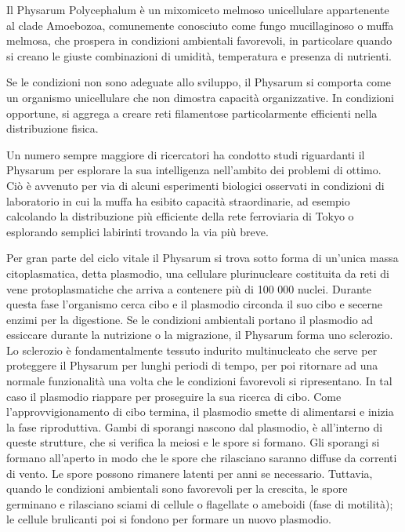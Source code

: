 Il Physarum Polycephalum\cite{Tsompanas2016} è un mixomiceto melmoso unicellulare appartenente al clade Amoebozoa, comunemente conosciuto come fungo mucillaginoso o muffa melmosa, che prospera in condizioni ambientali favorevoli, in particolare quando si creano le giuste combinazioni di umidità, temperatura e presenza di nutrienti.
\par
Se le condizioni non sono adeguate allo sviluppo, il Physarum si comporta come un organismo unicellulare che non dimostra capacità organizzative. In condizioni opportune, si aggrega a creare reti filamentose particolarmente efficienti nella distribuzione fisica.
\par 
Un numero sempre maggiore di ricercatori ha condotto studi riguardanti il Physarum per esplorare la sua intelligenza nell'ambito dei problemi di ottimo. Ciò è avvenuto per via di alcuni esperimenti biologici osservati in condizioni di laboratorio in cui la muffa ha esibito capacità straordinarie, ad esempio calcolando la distribuzione più efficiente della rete ferroviaria di Tokyo o esplorando semplici labirinti trovando la via più breve. 
\par
Per gran parte del ciclo vitale il Physarum si trova sotto forma di un'unica massa citoplasmatica, detta plasmodio, una cellulare plurinucleare costituita da reti di vene protoplasmatiche che arriva a contenere più di 100 000 nuclei.
Durante questa fase l'organismo cerca cibo e il plasmodio circonda il suo cibo e secerne enzimi per la digestione.
Se le condizioni ambientali portano il plasmodio ad essiccare durante la nutrizione o la migrazione, il Physarum forma uno sclerozio. Lo sclerozio è fondamentalmente tessuto indurito multinucleato che serve per proteggere il Physarum per lunghi periodi di tempo, per poi ritornare ad una normale funzionalità una volta che le condizioni favorevoli si ripresentano. In tal caso il plasmodio riappare per proseguire la sua ricerca di cibo.
Come l'approvvigionamento di cibo termina, il plasmodio smette di alimentarsi e inizia la fase riproduttiva. Gambi di sporangi nascono dal plasmodio, è all'interno di queste strutture, che si verifica la meiosi e le spore si formano. Gli sporangi si formano all'aperto in modo che le spore che rilasciano saranno diffuse da correnti di vento.
Le spore possono rimanere latenti per anni se necessario. Tuttavia, quando le condizioni ambientali sono favorevoli per la crescita, le spore germinano e rilasciano sciami di cellule o flagellate o ameboidi (fase di motilità); le cellule brulicanti poi si fondono per formare un nuovo plasmodio. 





